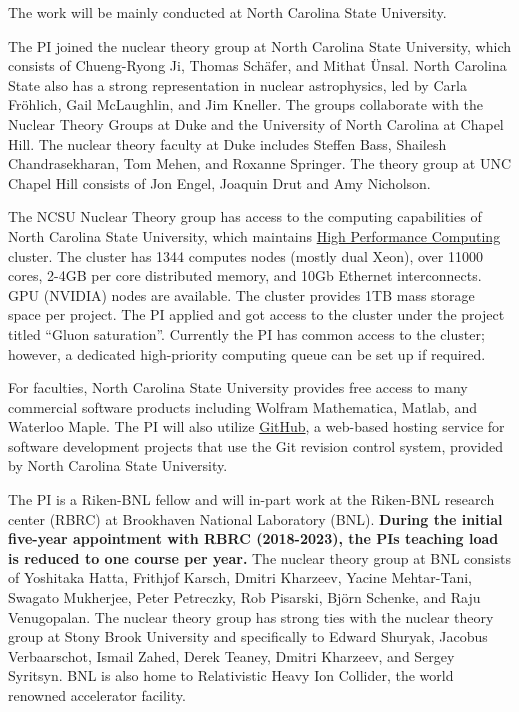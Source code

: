 \documentclass{DOEproposal}
\begin{document}
		The work will be mainly conducted at North Carolina State University. 


		The PI joined 
		the nuclear theory group at North Carolina State University, which consists
		of Chueng-Ryong Ji, Thomas Sch\"afer, and Mithat \"Unsal. 
		North Carolina State also has a strong representation in	
		nuclear astrophysics, led by Carla Fr\"ohlich, Gail McLaughlin,
		and Jim Kneller. 
		The groups collaborate with the Nuclear Theory Groups 
		at Duke  and the University of North
		Carolina at Chapel Hill. 
		The nuclear theory faculty at Duke includes Steffen Bass, 
		Shailesh Chandrasekharan, Tom Mehen, and Roxanne Springer. 
		The theory group at UNC Chapel Hill consists of Jon Engel, Joaquin Drut and Amy Nicholson.
		
		The  NCSU Nuclear Theory group has access to the computing capabilities of  
		North Carolina State University, which   
		maintains \href{https://projects.ncsu.edu/hpc//main.php}{High Performance Computing} 
		cluster. The cluster has 1344 computes nodes (mostly dual Xeon), 
		over 11000 cores, 2-4GB per core distributed memory, and 10Gb Ethernet interconnects.
		GPU (NVIDIA) nodes are available. 
		The cluster provides 1TB mass storage space per project. 
		The PI applied and got access to the cluster under the project titled  
		``Gluon saturation''. 
		Currently the PI has  common access 
		to the cluster; however, a dedicated high-priority computing queue can be set up 
		if required. 
		
		For faculties, North Carolina State University provides free access to 
		many commercial software products including Wolfram Mathematica, Matlab, and
		Waterloo Maple.  The PI will also utilize \href{https://github.ncsu.edu}{GitHub}, 
		a web-based hosting service 
		for software development projects that use the Git revision control system, 
		provided by North Carolina State University.  


		The PI is a Riken-BNL fellow and will in-part work  at 
		the Riken-BNL research center (RBRC) at Brookhaven National Laboratory (BNL).
		{\bf During the initial five-year appointment with RBRC 
		(2018-2023), the PIs teaching load is reduced to one course per year. }   
		The nuclear theory group at BNL consists of 
		Yoshitaka Hatta,
		Frithjof Karsch,
		Dmitri Kharzeev,
		Yacine Mehtar-Tani,
		Swagato Mukherjee,
		Peter Petreczky,
		Rob Pisarski,
		Bj\"orn Schenke,
		and Raju Venugopalan. 
		The nuclear theory group has strong ties with the nuclear theory group 
		at Stony Brook University and specifically to 
		Edward Shuryak, Jacobus Verbaarschot, Ismail Zahed,  Derek Teaney,
		Dmitri Kharzeev, and  Sergey Syritsyn. 
		BNL is also home to Relativistic Heavy Ion Collider, the world renowned 
		accelerator facility.    
\end{document}
